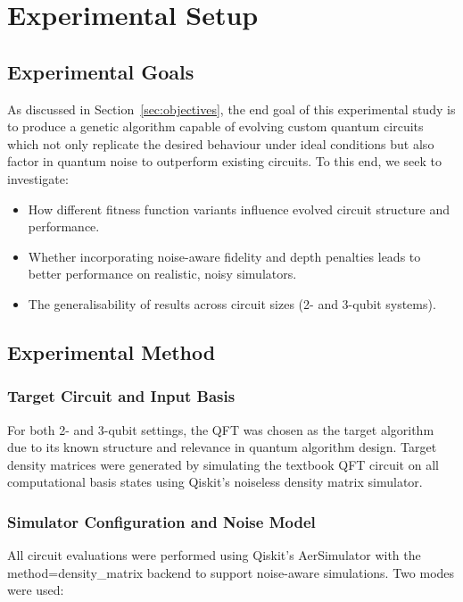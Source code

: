 \documentclass[11pt,a4paper]{article}
\begin{document}
%
%
\section{Experimental Setup} \label{sec:experimental}
\subsection{Experimental Goals}
As discussed in Section~\ref{sec:objectives}, the end goal of this experimental study is to produce a genetic algorithm capable of evolving custom quantum circuits which not only replicate the desired behaviour under ideal conditions but also factor in quantum noise to outperform existing circuits. To this end, we seek to investigate:
\begin{itemize}
    \item How different fitness function variants influence evolved circuit structure and performance.
    \item Whether incorporating noise-aware fidelity and depth penalties leads to better performance on realistic, noisy simulators.
    \item The generalisability of results across circuit sizes (2- and 3-qubit systems).
\end{itemize}

\subsection{Experimental Method}
\subsubsection*{Target Circuit and Input Basis}
For both 2- and 3-qubit settings, the QFT was chosen as the target algorithm due to its known structure and relevance in quantum algorithm design. Target density matrices were generated by simulating the textbook QFT circuit on all computational basis states using Qiskit's noiseless density matrix simulator.

\subsubsection*{Simulator Configuration and Noise Model}
All circuit evaluations were performed using Qiskit's AerSimulator with the method=density\_matrix backend to support noise-aware simulations. Two modes were used:
\end{document}
